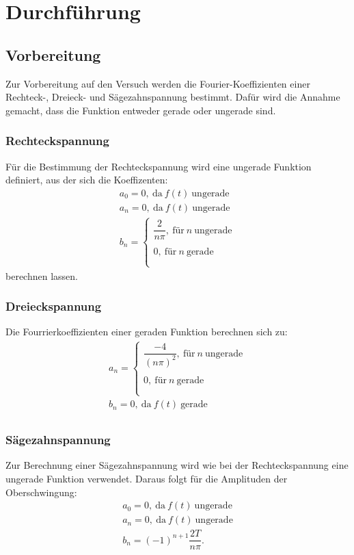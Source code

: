 
\section{Durchführung}
\subsection{Vorbereitung}
Zur Vorbereitung auf den Versuch werden die Fourier-Koeffizienten einer
Rechteck-, Dreieck- und Sägezahnspannung bestimmt. Dafür wird die Annahme
gemacht, dass die Funktion entweder gerade oder ungerade sind.
\subsubsection{Rechteckspannung}
Für die Bestimmung der Rechteckspannung wird eine ungerade Funktion definiert, aus der sich
die Koeffizenten:
\begin{align*}
 a_{0} = 0,\ \text{da}\ f(t)\ \text{ungerade}\\
 a_{n} = 0,\ \text{da}\ f(t)\ \text{ungerade}\\
 b_{n} =	\begin{cases}
			\dfrac{2}{n\pi} ,\ \text{für}\ n\ \text{ungerade}\\ \\
      0 ,\ \text{für}\ n\ \text{gerade}\\\\
		\end{cases}
\end{align*}
berechnen lassen.

\subsubsection{Dreieckspannung}
Die Fourrierkoeffizienten einer geraden Funktion berechnen sich zu:
\begin{align*}
  a_{n} =  \begin{cases}
 					\dfrac{-4}{(n\pi)^{2}} ,\ \text{für}\ n\ \text{ungerade}\\ \\
 					0 ,\ \text{für}\ n\ \text{gerade}\\\\
 				\end{cases}\\
  b_{n} = 0,\ \text{da}\ f(t)\ \text{gerade}\\
\end{align*}

\subsubsection{Sägezahnspannung}
Zur Berechnung einer Sägezahnspannung wird wie bei der Rechteckspannung eine
ungerade Funktion verwendet. Daraus folgt für die Amplituden der Oberschwingung:
\begin{align*}
 a_{0} = 0,\ \text{da}\ f(t)\ \text{ungerade}\\
 a_{n} = 0,\ \text{da}\ f(t)\ \text{ungerade}\\
 b_{n} = (-1)^{n+1} \dfrac{2T}{n\pi}.
\end{align*}
